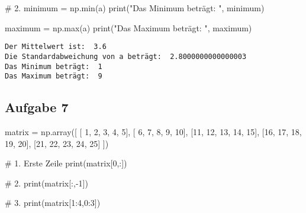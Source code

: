 \documentclass[
  letterpaper,
  DIV=11,
  numbers=noendperiod]{scrreprt}
\newenvironment{Shaded}{\begin{snugshade}}{\end{snugshade}}
\newcommand{\BuiltInTok}[1]{\textcolor[rgb]{0.00,0.23,0.31}{#1}}
\newcommand{\CommentTok}[1]{\textcolor[rgb]{0.37,0.37,0.37}{#1}}
\newcommand{\DecValTok}[1]{\textcolor[rgb]{0.68,0.00,0.00}{#1}}
\newcommand{\NormalTok}[1]{\textcolor[rgb]{0.00,0.23,0.31}{#1}}
\newcommand{\OperatorTok}[1]{\textcolor[rgb]{0.37,0.37,0.37}{#1}}
\newcommand{\StringTok}[1]{\textcolor[rgb]{0.13,0.47,0.30}{#1}}
\begin{document}
\begin{tcolorbox}
\begin{tcolorbox}
\begin{Shaded}
\begin{Highlighting}[]
\CommentTok{\# 2.}
\NormalTok{minimum }\OperatorTok{=}\NormalTok{ np.}\BuiltInTok{min}\NormalTok{(a)}
\BuiltInTok{print}\NormalTok{(}\StringTok{"Das Minimum beträgt: "}\NormalTok{, minimum)}

\NormalTok{maximum }\OperatorTok{=}\NormalTok{ np.}\BuiltInTok{max}\NormalTok{(a)}
\BuiltInTok{print}\NormalTok{(}\StringTok{"Das Maximum beträgt: "}\NormalTok{, maximum)}
\end{Highlighting}
\end{Shaded}

\begin{verbatim}
Der Mittelwert ist:  3.6
Die Standardabweichung von a beträgt:  2.8000000000000003
Das Minimum beträgt:  1
Das Maximum beträgt:  9
\end{verbatim}

\subsection*{Aufgabe 7}\label{aufgabe-7-1}

\begin{Shaded}
\begin{Highlighting}[]
\NormalTok{matrix }\OperatorTok{=}\NormalTok{ np.array([}
\NormalTok{    [ }\DecValTok{1}\NormalTok{,  }\DecValTok{2}\NormalTok{,  }\DecValTok{3}\NormalTok{,  }\DecValTok{4}\NormalTok{,  }\DecValTok{5}\NormalTok{],}
\NormalTok{    [ }\DecValTok{6}\NormalTok{,  }\DecValTok{7}\NormalTok{,  }\DecValTok{8}\NormalTok{,  }\DecValTok{9}\NormalTok{, }\DecValTok{10}\NormalTok{],}
\NormalTok{    [}\DecValTok{11}\NormalTok{, }\DecValTok{12}\NormalTok{, }\DecValTok{13}\NormalTok{, }\DecValTok{14}\NormalTok{, }\DecValTok{15}\NormalTok{],}
\NormalTok{    [}\DecValTok{16}\NormalTok{, }\DecValTok{17}\NormalTok{, }\DecValTok{18}\NormalTok{, }\DecValTok{19}\NormalTok{, }\DecValTok{20}\NormalTok{],}
\NormalTok{    [}\DecValTok{21}\NormalTok{, }\DecValTok{22}\NormalTok{, }\DecValTok{23}\NormalTok{, }\DecValTok{24}\NormalTok{, }\DecValTok{25}\NormalTok{]}
\NormalTok{])}

\CommentTok{\# 1. Erste Zeile}
\BuiltInTok{print}\NormalTok{(matrix[}\DecValTok{0}\NormalTok{,:])}

\CommentTok{\# 2.}
\BuiltInTok{print}\NormalTok{(matrix[:,}\OperatorTok{{-}}\DecValTok{1}\NormalTok{])}

\CommentTok{\# 3.}
\BuiltInTok{print}\NormalTok{(matrix[}\DecValTok{1}\NormalTok{:}\DecValTok{4}\NormalTok{,}\DecValTok{0}\NormalTok{:}\DecValTok{3}\NormalTok{])}
\end{Highlighting}
\end{Shaded}


\end{tcolorbox}
\end{tcolorbox}
\end{document}
